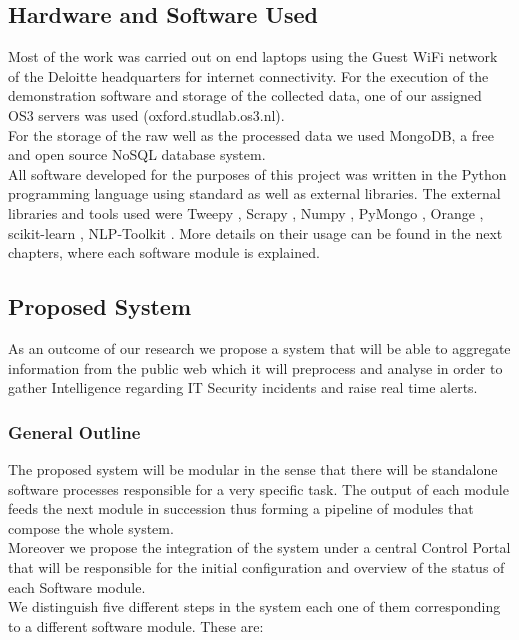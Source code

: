\documentclass[12pt]{article}
\begin{document}
\subsection{Hardware and Software Used}


Most of the work was carried out on end laptops using the Guest WiFi network of the Deloitte headquarters for internet connectivity. For the execution of the demonstration software and storage of the collected data, one of our assigned OS3 servers was used (oxford.studlab.os3.nl).\\ 
For the storage of the raw well as the processed data we used MongoDB, a free and open source NoSQL database system.\\ 
All software developed for the purposes of this project was written in the Python programming language using standard as well as external libraries. The external libraries and tools used were Tweepy \cite{tweepy}, Scrapy \cite{scrapy}, Numpy \cite{numpy}, PyMongo \cite{pymongo}, Orange \cite{orange}, scikit-learn \cite{sklearn}, NLP-Toolkit \cite{nltk}. More details on their usage can be found in the next chapters, where each software module is explained.


\subsection{Proposed System}
As an outcome of our research we propose a system that will be able to aggregate information from the public web which it will preprocess and analyse in order to gather Intelligence regarding IT Security incidents and raise real time alerts. 
 
\subsubsection{General Outline}
The proposed system will be modular in the sense that there will be standalone software processes responsible for a very specific task. The output of each module feeds the next module in succession thus forming a pipeline of modules that compose the whole system. \\
Moreover we propose the integration of the system under a central Control Portal that will be responsible for the initial configuration and overview of the status of each Software module.\\
We distinguish five different steps in the system each one of them corresponding to a different software module. These are:
\end{document}
